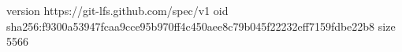 version https://git-lfs.github.com/spec/v1
oid sha256:f9300a53947fcaa9cce95b970ff4c450aee8c79b045f22232eff7159fdbe22b8
size 5566
